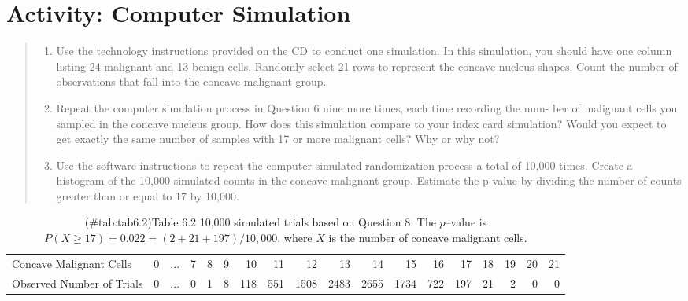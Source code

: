\documentclass[
]{report}
\providecommand{\tightlist}{%
  \setlength{\itemsep}{0pt}\setlength{\parskip}{0pt}}
\begin{document}
\section*{Activity: Computer Simulation}\label{activity-computer-simulation}

\begin{quote}
\begin{enumerate}
\def\labelenumi{\arabic{enumi}.}
\setcounter{enumi}{5}
\tightlist
\item
  Use the technology instructions provided on the CD to conduct one simulation. In this simulation, you
  should have one column listing 24 malignant and 13 benign cells. Randomly select 21 rows to represent
  the concave nucleus shapes. Count the number of observations that fall into the concave malignant group.
\item
  Repeat the computer simulation process in Question 6 nine more times, each time recording the num-
  ber of malignant cells you sampled in the concave nucleus group. How does this simulation compare to
  your index card simulation? Would you expect to get exactly the same number of samples with 17 or
  more malignant cells? Why or why not?
\item
  Use the software instructions to repeat the computer-simulated randomization process a total of 10,000
  times. Create a histogram of the 10,000 simulated counts in the concave malignant group. Estimate the
  p-value by dividing the number of counts greater than or equal to 17 by 10,000.
\end{enumerate}
\end{quote}

\begin{table}

\caption{(\#tab:tab6.2)Table 6.2 10,000 simulated trials based on Question 8. The $p$–value is $P(X\ge17)=0.022=(2+21+197)/10,000$, where $X$ is the number of concave malignant cells.}
\centering
\begin{tabular}[t]{>{\raggedright\arraybackslash}p{2cm}lrrrrrrrrrrrrrrrr}
\toprule
\midrule
Concave Malignant Cells & 0 & ... & 7 & 8 & 9 & 10 & 11 & 12 & 13 & 14 & 15 & 16 & 17 & 18 & 19 & 20 & 21\\
Observed Number of Trials & 0 & ... & 0 & 1 & 8 & 118 & 551 & 1508 & 2483 & 2655 & 1734 & 722 & 197 & 21 & 2 & 0 & 0\\
\bottomrule
\end{tabular}
\end{table}
\end{document}
